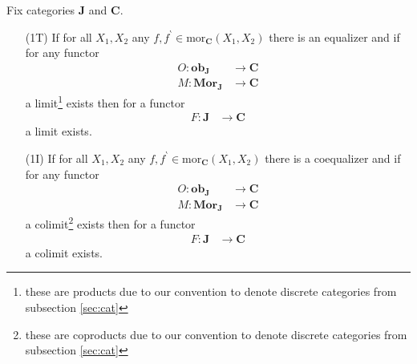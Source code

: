 \begin{thm}
\label{thm:limitexistence}
Fix categories $\mathbf{J}$ and $\mathbf{C}$.
\begin{enumerate}
\item[(1T)]
If for all $X_{1},X_{2}$ any $f,f^{\backprime} \in \mathrm{mor}_{\mathbf{C}}(X_{1},X_{2})$ there is an equalizer and if for any functor
\begin{align*}
  O
  \colon
  \mathbf{ob}_{\mathbf{J}}
  &\rightarrow
  \mathbf{C}
  \\
  M
  \colon
  \mathbf{Mor}_{\mathbf{J}}
  &\rightarrow
  \mathbf{C}
\end{align*}
a limit\footnote{these are products due to our convention to denote discrete categories from subsection \ref{sec:cat}} exists then for a functor
\begin{align*}
  F
  \colon
  \mathbf{J}
  &\rightarrow
  \mathbf{C}
\end{align*}
a limit exists.
\item[(1I)]
If for all $X_{1},X_{2}$ any $f,f^{\backprime} \in \mathrm{mor}_{\mathbf{C}}(X_{1},X_{2})$ there is a coequalizer and if for any functor
\begin{align*}
  O
  \colon
  \mathbf{ob}_{\mathbf{J}}
  &\rightarrow
  \mathbf{C}
  \\
  M
  \colon
  \mathbf{Mor}_{\mathbf{J}}
  &\rightarrow
  \mathbf{C}
\end{align*}
a colimit\footnote{these are coproducts due to our convention to denote discrete categories from subsection \ref{sec:cat}} exists then for a functor
\begin{align*}
  F
  \colon
  \mathbf{J}
  &\rightarrow
  \mathbf{C}
\end{align*}
a colimit exists.
\end{enumerate}
\end{thm}
